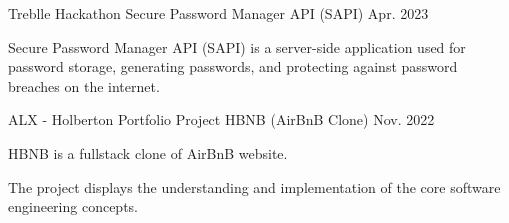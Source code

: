 \begin{cventries}
  \cventry
  {Treblle Hackathon} %
  {Secure Password Manager API (SAPI) } %
  {} %
  {Apr. 2023} %
  {
    \begin{cvitems} %
      \item {Secure Password Manager API (SAPI) is a server-side application used for password storage, generating passwords, and protecting against password breaches on the internet.}
    \end{cvitems}
  }

  \cventry
  {ALX - Holberton Portfolio Project} %
  {HBNB (AirBnB Clone) } %
  {} %
  {Nov. 2022} %
  {
    \begin{cvitems} %
      \item {HBNB is a fullstack clone of AirBnB website.}
      \item {The project displays the understanding and implementation of the core software engineering concepts.}
    \end{cvitems}
  }
\end{cventries}

